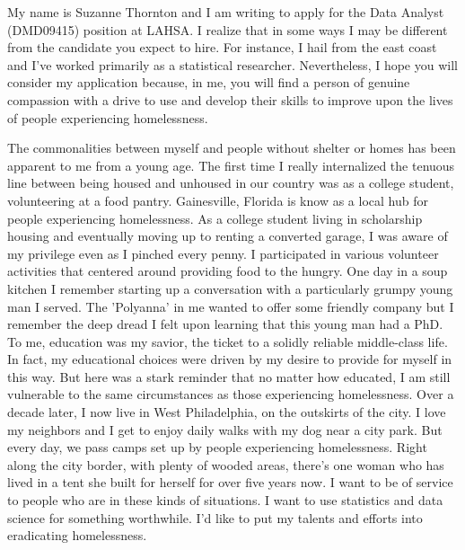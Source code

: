 \documentclass[11pt,a4paper,sans]{moderncv}
\begin{document}

	
	My name is Suzanne Thornton and I am writing to apply for the Data Analyst (DMD09415) position at LAHSA. I realize that in some ways I may be different from the candidate you expect to hire. For instance, I hail from the east coast and I've worked primarily as a statistical researcher. Nevertheless, I hope you will consider my application because, in me, you will find a person of genuine compassion with a drive to use and develop their skills to improve upon the lives of people experiencing homelessness.    
	
	The commonalities between myself and people without shelter or homes has been apparent to me from a young age. The first time I really internalized the tenuous line between being housed and unhoused in our country was as a college student, volunteering at a food pantry. Gainesville, Florida is know as a local hub for people experiencing homelessness. As a college student living in scholarship housing and eventually moving up to renting a converted garage, I was aware of my privilege even as I pinched every penny. I participated in various volunteer activities that centered around providing food to the hungry. One day in a soup kitchen I remember starting up a conversation with a particularly grumpy young man I served. The 'Polyanna' in me wanted to offer some friendly company but I remember the deep dread I felt upon learning that this young man had a PhD. To me, education was my savior, the ticket to a solidly reliable middle-class life. In fact, my educational choices were driven by my desire to provide for myself in this way. But here was a stark reminder that no matter how educated, I am still vulnerable to the same circumstances as those experiencing homelessness. Over a decade later, I now live in West Philadelphia, on the outskirts of the city. I love my neighbors and I get to enjoy daily walks with my dog near a city park. But every day, we pass camps set up by people experiencing homelessness. Right along the city border, with plenty of wooded areas, there's one woman who has lived in a tent she built for herself for over five years now. I want to be of service to people who are in these kinds of situations. I want to use statistics and data science for something worthwhile. I'd like to put my talents and efforts into eradicating homelessness. 
	
\end{document}
